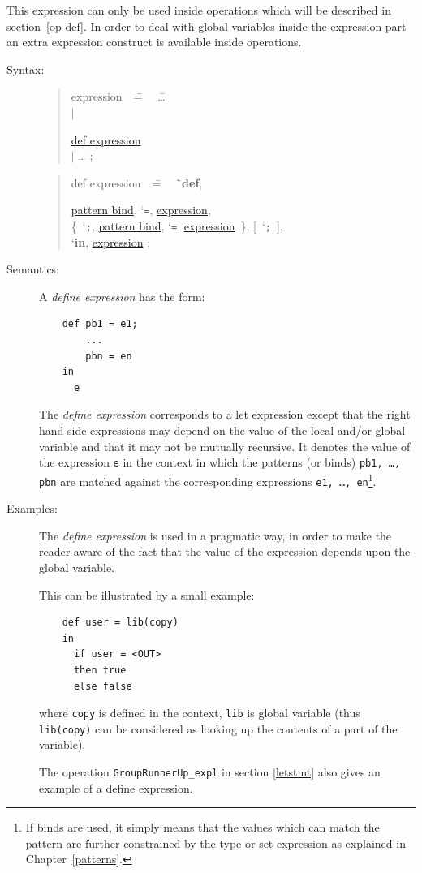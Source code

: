 \documentclass{overturerepchap}
\newcommand{\Lit}[1]{`{\tt #1}\Quote}
\newcommand{\Rule}[2]{
  \begin{quote}\begin{tabbing}
    #1\index{#1}\ \ \= = \ \ \= #2  ; %
    
  \end{tabbing}\end{quote}
  }
\newcommand{\Ruleref}[1]{
  \hyperlink{rule:#1}{#1}}
\newcommand{\SeqPt}[1]{\{\ #1\ \}}
\newcommand{\lfeed}{\\ \> \>}
\newcommand{\dsep}{\\ \> $|$ \>}
\newcommand{\Lop}[1]{`{\bf\ttfamily #1}\Quote}
\newcommand{\OptPt}[1]{[\ #1\ ]}
\begin{document}
This expression can only be used inside operations which will be
described in section~\ref{op-def}. In order to deal with global variables
inside the expression part an extra expression construct is available
inside operations.

\begin{description}
\item[Syntax:]
  \Rule{expression}{
    \ldots \dsep 
    \Ruleref{def expression} \dsep
    \ldots
    }

\Rule{def expression}{
  \Lop{def}, 
  \Ruleref{pattern bind}, \Lit{=}, \Ruleref{expression}, \lfeed
  \SeqPt{\Lit{;}, \Ruleref{pattern bind}, \Lit{=}, \Ruleref{expression}}, \OptPt{\Lit{;}},
  \lfeed
  \Lop{in}, \Ruleref{expression}
  } 

\item[Semantics:] A {\it define expression} has the form:
  \begin{lstlisting}
    def pb1 = e1;
        ...
        pbn = en
    in
      e
  \end{lstlisting}
  The {\it define expression} corresponds to a let expression except
  that the right hand side expressions may depend on the value of the
  local and/or
  global variable and that it may not be mutually recursive.
  It denotes the value of the expression {\tt e} in the
  context in which the patterns (or binds) {\tt pb1, \ldots, pbn} are
  matched against the corresponding expressions {\tt e1, \ldots,
    en}\footnote{If binds are used, it simply means that the values
    which can match the pattern are further constrained by the type or
    set expression as explained in Chapter~\ref{patterns}.}.

\item[Examples:] The {\it define expression} is
  used in a pragmatic way, in order to make the reader aware of the fact that
  the value of the expression depends upon the global variable.

  This can be illustrated by a small example:
  \begin{lstlisting}
    def user = lib(copy) 
    in
      if user = <OUT>
      then true
      else false
  \end{lstlisting}      
  where {\tt copy} is defined in the context, {\tt lib} is global
  variable (thus {\tt lib(copy)} can be considered as looking up the
  contents of a part of the variable).

  The operation \texttt{GroupRunnerUp\_expl} in section \ref{letstmt}
  also gives an example of a define expression.
\end{description}
\end{document}
